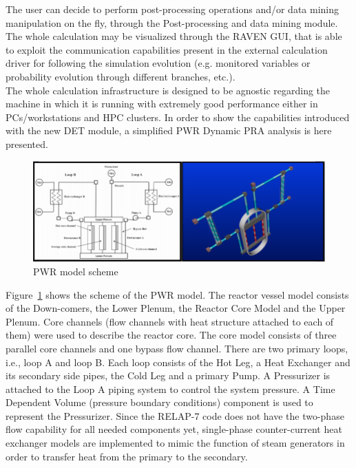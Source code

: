 \documentclass{mc2013}
\begin{document}
The user can decide to perform post-processing operations and/or data mining manipulation on the fly, through the Post-processing and data mining module. The whole calculation may be visualized through the RAVEN GUI, that is able to exploit the communication capabilities present in the external calculation driver for following the simulation evolution (e.g. monitored variables or probability evolution through different branches, etc.). \\ The whole calculation infrastructure is designed to be agnostic regarding the machine in which it is running with extremely good performance either in PCs/workstations and HPC clusters. 
\label{sec:demo}
In order to show the capabilities introduced with the new DET module, a simplified PWR Dynamic PRA analysis is here presented.
\begin{figure}[h]
   \centering
    \includegraphics[width=1.0\textwidth]{figures/PWR_TMI_SCHEME.PNG}
    \caption{PWR model scheme}
    \label{fig:PWRmodel}
\end{figure}
Figure~\ref{fig:PWRmodel} shows the scheme of the PWR model. The reactor vessel model consists of the Down-comers, the Lower Plenum, the Reactor Core Model and the Upper Plenum. Core channels (flow channels with heat structure attached to each of them) were used to describe the reactor core. The core model consists of three parallel core channels and one bypass flow channel. 
There are two primary loops, i.e., loop A and loop B. Each loop consists of the Hot Leg, a Heat Exchanger and its secondary side pipes, the Cold Leg and a primary Pump. A Pressurizer is attached to the Loop A piping system to control the system pressure. A Time Dependent Volume (pressure boundary conditions) component is used to represent the Pressurizer. Since the RELAP-7 code does not have the two-phase flow capability for all needed components yet, single-phase counter-current heat exchanger models are implemented to mimic the function of steam generators in order to transfer heat from the primary to the secondary.
\end{document}
